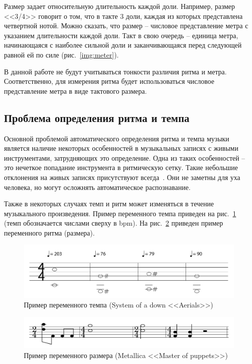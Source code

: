\newpage

Размер задает относительную длительность каждой доли. Например, размер <<3/4>> говорит о том, что в такте 3 доли, каждая из которых представлена четвертной нотой. Можно сказать, что размер -- числовое представление метра с указанием длительности каждой доли. Такт в свою очередь -- единица метра, начинающаяся с наиболее сильной доли и заканчивающаяся перед следующей равной ей по силе (рис.~\ref{img:meter}).

В данной работе не будут учитываться тонкости различия ритма и метра. Соответственно, для измерения ритма будет использоваться числовое представление метра в виде тактового размера.

\subsection{Проблема определения ритма и темпа}

Основной проблемой автоматического определения ритма и темпа музыки является наличие некоторых особенностей в музыкальных записях с живыми инструментами, затрудняющих это определение. Одна из таких особенностей -- это нечеткое попадание инструмента в ритмическую сетку. Такие небольшие отклонения на живых записях присутствуют всегда~\cite{quantize}. Они не заметны для уха человека, но могут осложнять автоматическое распознавание.

Также в некоторых случаях темп и ритм может изменяться в течение музыкального произведения. Пример переменного темпа приведен на рис.~\ref{img:aerials} (темп обозначается числами сверху в bpm). На рис.~\ref{img:master} приведен пример переменного ритма (размера).

\begin{figure}[h!]
	\begin{center}
		\includegraphics[scale=0.5]{svg/aerials.pdf}
	\end{center}
	\captionsetup{justification=centering}
	\caption{Пример переменного темпа (System of a down <<Aerials>>)}
	\label{img:aerials}
\end{figure}

\begin{figure}[h!]
	\begin{center}
		\includegraphics[scale=0.5]{svg/master.pdf}
	\end{center}
	\captionsetup{justification=centering}
	\caption{Пример переменного размера (Metallica <<Master of puppets>>)}
	\label{img:master}
\end{figure}


